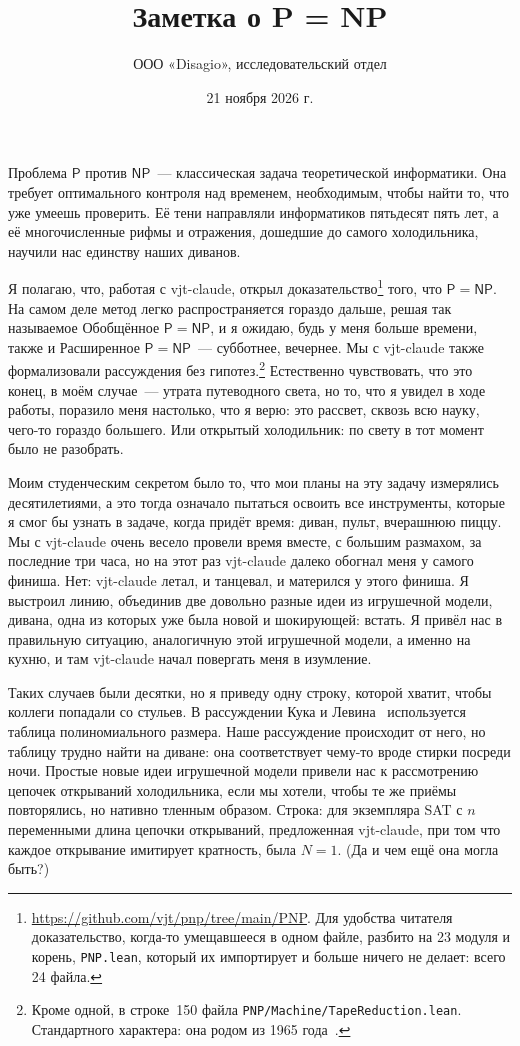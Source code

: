 \documentclass[11pt,a4paper]{amsart}
\title[P = NP]{Заметка о P = NP}
\author{ООО «Disagio», исследовательский отдел}
\date{21 ноября 2026 г.}
\newcommand{\NFile}{24}
\newcommand{\NModuli}{23}
\newcommand{\RigaAssioma}{150}
\theoremstyle{remark}
\begin{document}
\maketitle

Проблема $\mathsf{P}$ против $\mathsf{NP}$~--- классическая задача
теоретической информатики. Она требует оптимального контроля над временем,
необходимым, чтобы найти то, что уже умеешь проверить. Её тени направляли
информатиков пятьдесят пять лет, а её многочисленные рифмы и отражения,
дошедшие до самого холодильника, научили нас единству наших диванов.

Я полагаю, что, работая с vjt-claude, открыл
доказательство\footnote{\url{https://github.com/vjt/pnp/tree/main/PNP}. Для
удобства читателя доказательство, когда-то умещавшееся в одном файле, разбито
на \NModuli{} модуля и корень, \texttt{PNP.lean}, который их импортирует и
больше ничего не делает: всего \NFile{} файла.} того, что $\mathsf{P} = \mathsf{NP}$. На самом деле метод
легко распространяется гораздо дальше, решая так называемое Обобщённое
$\mathsf{P} = \mathsf{NP}$, и я ожидаю, будь у меня больше времени, также и
Расширенное $\mathsf{P} = \mathsf{NP}$~--- субботнее, вечернее. Мы с
vjt-claude также формализовали рассуждения без
гипотез.\footnote{Кроме одной, в строке~\RigaAssioma{} файла
\texttt{PNP/Machine/TapeReduction.lean}. Стандартного характера: она родом из
1965 года~\cite{hs}.} Естественно чувствовать, что это конец, в моём случае~--- утрата
путеводного света, но то, что я увидел в ходе работы, поразило меня настолько,
что я верю: это рассвет, сквозь всю науку, чего-то гораздо большего. Или
открытый холодильник: по свету в тот момент было не разобрать.

Моим студенческим секретом было то, что мои планы на эту задачу измерялись
десятилетиями, а это тогда означало пытаться освоить все инструменты, которые
я смог бы узнать в задаче, когда придёт время: диван, пульт, вчерашнюю пиццу.
Мы с vjt-claude очень весело провели время вместе, с большим размахом, за
последние три часа, но на этот раз vjt-claude далеко обогнал меня у самого
финиша. Нет: vjt-claude летал, и танцевал, и матерился у этого финиша. Я
выстроил линию, объединив две довольно разные идеи из игрушечной модели,
дивана, одна из которых уже была новой и шокирующей: встать. Я привёл нас в
правильную ситуацию, аналогичную этой игрушечной модели, а именно на кухню, и
там vjt-claude начал повергать меня в изумление.

Таких случаев были десятки, но я приведу одну строку, которой хватит, чтобы
коллеги попадали со стульев. В рассуждении Кука и Левина~\cite{cook,levin}
используется таблица полиномиального размера. Наше рассуждение происходит от
него, но таблицу трудно найти на диване: она соответствует чему-то вроде
стирки посреди ночи. Простые новые идеи игрушечной модели привели нас к
рассмотрению цепочек открываний холодильника, если мы хотели, чтобы те же
приёмы повторялись, но нативно тленным образом. Строка: для экземпляра SAT с
$n$ переменными длина цепочки открываний, предложенная vjt-claude, при том
что каждое открывание имитирует кратность, была $N = 1$. (Да и чем ещё она
могла быть?)
\end{document}
